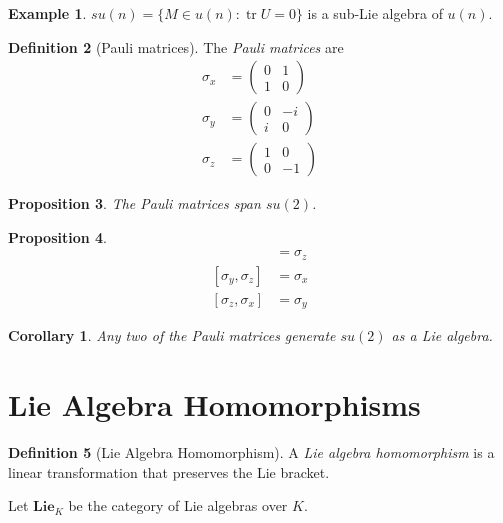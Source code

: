 \documentclass{book}
\newtheorem{prop}{Proposition}[chapter]
\newtheorem{cor}{Corollary}[prop]
\theoremstyle{definition}
\newtheorem{df}[prop]{Definition}
\newtheorem{ex}[prop]{Example}
\newcommand{\tr}{\ensuremath{\operatorname{tr}}}
\begin{document}
\begin{ex}
$su(n) = \{ M \in u(n) : \tr U = 0 \}$ is a sub-Lie algebra of $u(n)$.
\end{ex}

\begin{df}[Pauli matrices]
The \emph{Pauli matrices} are
\begin{align*}
\sigma_x & = \left( \begin{array}{cc}
0 & 1 \\ 1 & 0
\end{array} \right) \\
\sigma_y & = \left( \begin{array}{cc}
0 & -i \\ i & 0
\end{array} \right) \\
\sigma_z & = \left( \begin{array}{cc}
1 & 0 \\ 0 & -1
\end{array} \right)
\end{align*}
\end{df}

\begin{prop}
The Pauli matrices span $su(2)$.
\end{prop}

\begin{prop}
\begin{align*}
[\sigma_x, \sigma_y] & = \sigma_z \\
[\sigma_y, \sigma_z] & = \sigma_x \\
[\sigma_z, \sigma_x] & = \sigma_y
\end{align*}
\end{prop}

\begin{cor}
Any two of the Pauli matrices generate $su(2)$ as a Lie algebra.
\end{cor}

\section{Lie Algebra Homomorphisms}

\begin{df}[Lie Algebra Homomorphism]
A \emph{Lie algebra homomorphism} is a linear transformation that preserves the Lie bracket.

Let $\mathbf{Lie}_K$ be the category of Lie algebras over $K$.
\end{df}
\end{document}
